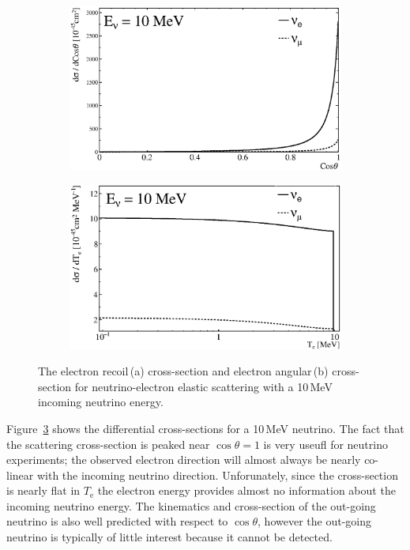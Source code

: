 \begin{figure}[htbp]
\centering
\begin{subfigure}[b]{0.48\textwidth}
\centering
\includegraphics[width=\textwidth]{neutrino_xsec_energy}
\caption[ES Recoil Energy Cross-Section]{}
\label{}
\end{subfigure}
\hfill
\begin{subfigure}[b]{0.48\textwidth}
\centering
\includegraphics[width=\textwidth]{neutrino_xsec_angular}
\caption[ES Angular Cross-Section]{}
\label{}
\end{subfigure}
\caption[Neutrino-Electron ES Cross-Sections]{The electron recoil\,(a)
cross-section and electron angular\,(b) cross-section for neutrino-electron
elastic scattering with a 10\,MeV incoming neutrino energy.}
\label{fig:es_xsec}
\end{figure}


Figure~\ref{fig:es_xsec} shows the differential cross-sections for a 10\,MeV neutrino.
The fact that the scattering cross-section is peaked near $\cos\theta=1$
is very useufl for neutrino experiments; the observed electron direction
will almost always be nearly co-linear with the incoming neutrino direction.
Unforunately, since the cross-section is nearly flat in $T_{\mathrm{e}}$
the electron energy provides almost no information about the incoming neutrino
energy.
The kinematics and cross-section of the out-going neutrino is also
well predicted with respect to $\cos\theta$, however the out-going
neutrino is typically of little interest because it cannot be detected.

